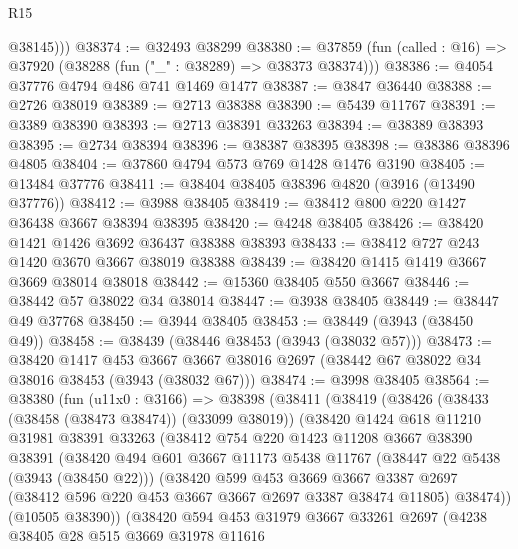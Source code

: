 \begin{lexlean}{R15}
\begin{coremodule}
          @38145)))
@38374 := @32493 @38299
@38380 := @37859 (fun (called : @16) => @37920 (@38288 (fun ("_" : @38289) => @38373 @38374)))
@38386 := @4054 @37776 @4794 @486 @741 @1469 @1477
@38387 := @3847 @36440
@38388 := @2726 @38019
@38389 := @2713 @38388
@38390 := @5439 @11767
@38391 := @3389 @38390
@38393 := @2713 @38391 @33263
@38394 := @38389 @38393
@38395 := @2734 @38394
@38396 := @38387 @38395
@38398 := @38386 @38396 @4805
@38404 := @37860 @4794 @573 @769 @1428 @1476 @3190
@38405 := @13484 @37776
@38411 := @38404 @38405 @38396 @4820 (@3916 (@13490 @37776))
@38412 := @3988 @38405
@38419 := @38412 @800 @220 @1427 @36438 @3667 @38394 @38395
@38420 := @4248 @38405
@38426 := @38420 @1421 @1426 @3692 @36437 @38388 @38393
@38433 := @38412 @727 @243 @1420 @3670 @3667 @38019 @38388
@38439 := @38420 @1415 @1419 @3667 @3669 @38014 @38018
@38442 := @15360 @38405 @550 @3667
@38446 := @38442 @57 @38022 @34 @38014
@38447 := @3938 @38405
@38449 := @38447 @49 @37768
@38450 := @3944 @38405
@38453 := @38449 (@3943 (@38450 @49))
@38458 := @38439 (@38446 @38453 (@3943 (@38032 @57)))
@38473 := @38420
    @1417
    @453
    @3667
    @3667
    @38016
    @2697
    (@38442 @67 @38022 @34 @38016 @38453 (@3943 (@38032 @67)))
@38474 := @3998 @38405
@38564 := @38380
    (fun (u11x0 : @3166) =>
    @38398
      (@38411
        (@38419
          (@38426
            (@38433 (@38458 (@38473 @38474)) (@33099 @38019))
            (@38420
              @1424
              @618
              @11210
              @31981
              @38391
              @33263
              (@38412
                @754
                @220
                @1423
                @11208
                @3667
                @38390
                @38391
                (@38420
                  @494
                  @601
                  @3667
                  @11173
                  @5438
                  @11767
                  (@38447 @22 @5438 (@3943 (@38450 @22)))
                  (@38420
                    @599
                    @453
                    @3669
                    @3667
                    @3387
                    @2697
                    (@38412 @596 @220 @453 @3667 @3667 @2697 @3387 @38474 @11805)
                    @38474))
                (@10505 @38390))
              (@38420
                @594
                @453
                @31979
                @3667
                @33261
                @2697
                (@4238
                  @38405
                  @28
                  @515
                  @3669
                  @31978
                  @11616

\end{coremodule}
\end{lexlean}
